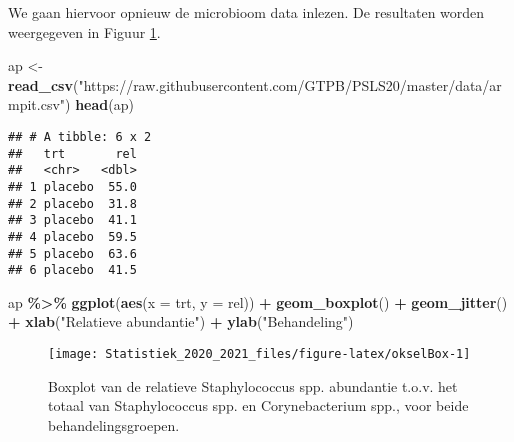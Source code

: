\documentclass[
  12pt,dutch,coursenotes]{book}
\newenvironment{Shaded}{\begin{snugshade}}{\end{snugshade}}
\newcommand{\CommentTok}[1]{\textcolor[rgb]{0.56,0.35,0.01}{\textit{#1}}}
\newcommand{\DataTypeTok}[1]{\textcolor[rgb]{0.13,0.29,0.53}{#1}}
\newcommand{\KeywordTok}[1]{\textcolor[rgb]{0.13,0.29,0.53}{\textbf{#1}}}
\newcommand{\NormalTok}[1]{#1}
\newcommand{\OperatorTok}[1]{\textcolor[rgb]{0.81,0.36,0.00}{\textbf{#1}}}
\newcommand{\StringTok}[1]{\textcolor[rgb]{0.31,0.60,0.02}{#1}}
\theoremstyle{definition}
\theoremstyle{definition}
\theoremstyle{definition}
\theoremstyle{remark}
\begin{document}
We gaan hiervoor opnieuw de microbioom data inlezen.
De resultaten worden weergegeven in Figuur \ref{fig:okselBox}.

\begin{Shaded}
\begin{Highlighting}[]
\NormalTok{ap \textless{}{-}}\StringTok{ }\KeywordTok{read\_csv}\NormalTok{(}\StringTok{"https://raw.githubusercontent.com/GTPB/PSLS20/master/data/armpit.csv"}\NormalTok{)}
\KeywordTok{head}\NormalTok{(ap)}
\end{Highlighting}
\end{Shaded}

\begin{verbatim}
## # A tibble: 6 x 2
##   trt       rel
##   <chr>   <dbl>
## 1 placebo  55.0
## 2 placebo  31.8
## 3 placebo  41.1
## 4 placebo  59.5
## 5 placebo  63.6
## 6 placebo  41.5
\end{verbatim}

\begin{Shaded}
\begin{Highlighting}[]
\NormalTok{ap }\OperatorTok{\%\textgreater{}\%}\StringTok{ }\KeywordTok{ggplot}\NormalTok{(}\KeywordTok{aes}\NormalTok{(}\DataTypeTok{x =}\NormalTok{ trt, }\DataTypeTok{y =}\NormalTok{ rel)) }\OperatorTok{+}\StringTok{ }\KeywordTok{geom\_boxplot}\NormalTok{() }\OperatorTok{+}\StringTok{ }
\StringTok{    }\KeywordTok{geom\_jitter}\NormalTok{() }\OperatorTok{+}\StringTok{ }\KeywordTok{xlab}\NormalTok{(}\StringTok{"Relatieve abundantie"}\NormalTok{) }\OperatorTok{+}\StringTok{ }
\StringTok{    }\KeywordTok{ylab}\NormalTok{(}\StringTok{"Behandeling"}\NormalTok{)}
\end{Highlighting}
\end{Shaded}

\begin{figure}

{\centering \texttt{[image: Statistiek\_2020\_2021\_files/figure-latex/okselBox-1]} 

}

\caption{Boxplot van de relatieve Staphylococcus spp. abundantie t.o.v. het totaal van Staphylococcus spp. en Corynebacterium spp., voor beide behandelingsgroepen.}\label{fig:okselBox}
\end{figure}

\begin{Shaded}
\end{Shaded}
\end{document}
